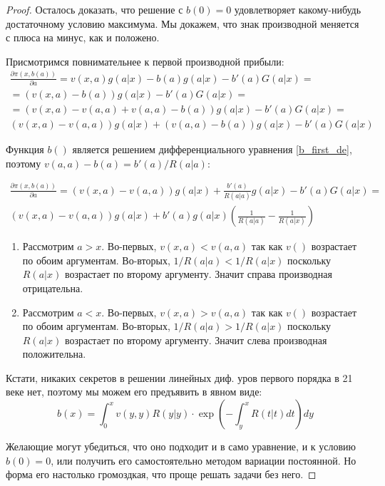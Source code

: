 \begin{itemize}
\begin{proof}
Осталось доказать, что решение с $ b(0)=0 $ удовлетворяет какому-нибудь достаточному условию максимума. Мы докажем, что знак производной меняется с плюса на минус, как и положено.


Присмотримся повнимательнее к первой производной прибыли:
\begin{multline}
\frac{\partial \pi(x,b(a))}{\partial a}=v(x,a)g(a|x)-b(a)g(a|x)-b'(a)G(a|x)=\\
=(v(x,a)-b(a))g(a|x)-b'(a)G(a|x)=\\
=(v(x,a)-v(a,a)+v(a,a)-b(a))g(a|x)-b'(a)G(a|x)=\\
(v(x,a)-v(a,a))g(a|x)+(v(a,a)-b(a))g(a|x)-b'(a)G(a|x)
\end{multline}

Функция $ b() $ является решением дифференциального уравнения \ref{b_first_de}, поэтому $ v(a,a)-b(a)=b'(a)/R(a|a) $:

\begin{multline}
\frac{\partial \pi(x,b(a))}{\partial a}=(v(x,a)-v(a,a))g(a|x)+\frac{b'(a)}{R(a|a)}g(a|x)-b'(a)G(a|x)=\\
(v(x,a)-v(a,a))g(a|x)+b'(a)g(a|x)\left(\frac{1}{R(a|a)}-\frac{1}{R(a|x)} \right)
\end{multline}

\begin{enumerate}
\item Рассмотрим $ a>x $. Во-первых, $ v(x,a)<v(a,a) $ так как $ v() $ возрастает по обоим аргументам. Во-вторых, $1/R(a|a)<1/R(a|x) $ поскольку $ R(a|x) $ возрастает по второму аргументу. Значит справа производная отрицательна.
\item Рассмотрим $ a<x $. Во-первых, $ v(x,a)>v(a,a) $ так как $ v() $ возрастает по обоим аргументам. Во-вторых, $1/R(a|a)>1/R(a|x) $ поскольку $ R(a|x) $ возрастает по второму аргументу. Значит слева производная положительна.
\end{enumerate}

Кстати, никаких секретов в решении линейных диф. уров первого порядка в 21 веке нет, поэтому мы можем его предъявить в явном виде:
\begin{equation}
b(x)=\int_{0}^{x}v(y,y)R(y|y)\cdot \exp\left(-\int_{y}^{x}R(t|t)dt\right) dy
\end{equation}

Желающие могут убедиться, что оно подходит и в само уравнение, и к условию $ b(0)=0 $, или получить его самостоятельно методом вариации постоянной. Но форма его настолько громоздкая, что проще решать задачи без него. 
\end{proof}


\end{itemize}
